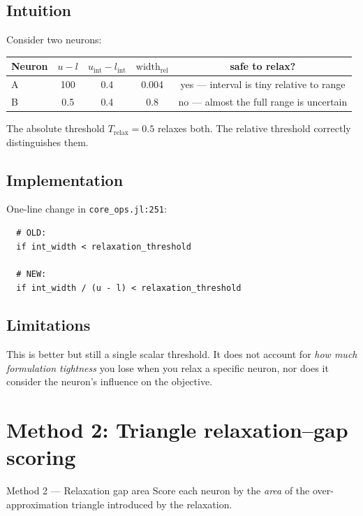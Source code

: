 \documentclass[11pt,a4paper]{article}
\newcommand{\Trelax}{T_{\mathrm{relax}}}
\newcommand{\widthop}{\mathrm{width}}
\begin{document}
\subsection{Intuition}
Consider two neurons:
\begin{center}
\begin{tabular}{lcccc}
\toprule
Neuron & $u-l$ & $u_{\mathrm{int}}-l_{\mathrm{int}}$ & $\widthop_{\mathrm{rel}}$ & safe to relax? \\
\midrule
A & 100 & 0.4 & 0.004 & \textcolor{green!60!black}{yes --- interval is tiny relative to range} \\
B & 0.5 & 0.4 & 0.8   & \textcolor{red!70!black}{no --- almost the full range is uncertain} \\
\bottomrule
\end{tabular}
\end{center}
The absolute threshold $\Trelax=0.5$ relaxes both.  The relative threshold
correctly distinguishes them.

\subsection{Implementation}
One-line change in \texttt{core\_ops.jl:251}:
\begin{verbatim}
  # OLD:
  if int_width < relaxation_threshold

  # NEW:
  if int_width / (u - l) < relaxation_threshold
\end{verbatim}

\subsection{Limitations}
This is better but still a single scalar threshold.  It does not account for
\emph{how much formulation tightness} you lose when you relax a specific neuron,
nor does it consider the neuron's influence on the objective.


\section{Method 2: Triangle relaxation--gap scoring}\label{sec:method2}

\begin{idea}{Method 2 --- Relaxation gap area}
Score each neuron by the \emph{area} of the over-approximation triangle
introduced by the relaxation.
\end{idea}
\end{document}
